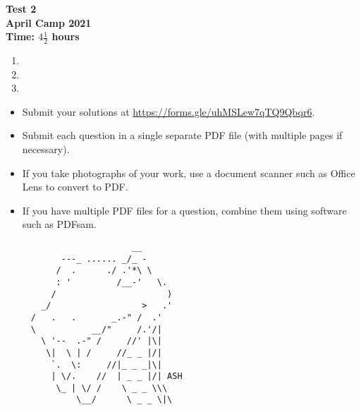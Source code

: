 \documentclass{article}
\begin{document}
\thispagestyle{empty}

\begin{center}
  \textbf{\Large Test 2}
  \\ \vspace{1em}
  \textbf{\large April Camp 2021}
  \\ \vspace{1em}
  \textbf{\large Time: $4\frac{1}{2}$ hours}
\end{center}

\vspace{24pt}

\begin{enumerate}[itemsep=18pt]

\item


\item


\item

\end{enumerate}


\vfill
\begin{itemize}
	\item Submit your solutions at \url{https://forms.gle/uhMSLew7qTQ9Qbqr6}.
	\item Submit each question in a single separate PDF file (with multiple pages if necessary).
	\item If you take photographs of your work, use a document scanner such as Office Lens to convert to PDF.
	\item If you have multiple PDF files for a question, combine them using software such as PDFsam.
\end{itemize}

\vfill
\centering
\begin{BVerbatim}
                         __
           ---_ ...... _/_ -
          /  .      ./ .'*\ \
          : '         /__-'   \.
         /                      )
       _/                  >   .'
     /   .   .       _.-" /  .'
     \           __/"     /.'/|
       \ '--  .-" /     //' |\|
        \|  \ | /     //_ _ |/|
         `.  \:     //|_ _ _|\|
         | \/.    //  | _ _ |/| ASH
          \_ | \/ /    \ _ _ \\\
              \__/      \ _ _ \|\
\end{BVerbatim}
\end{document}
